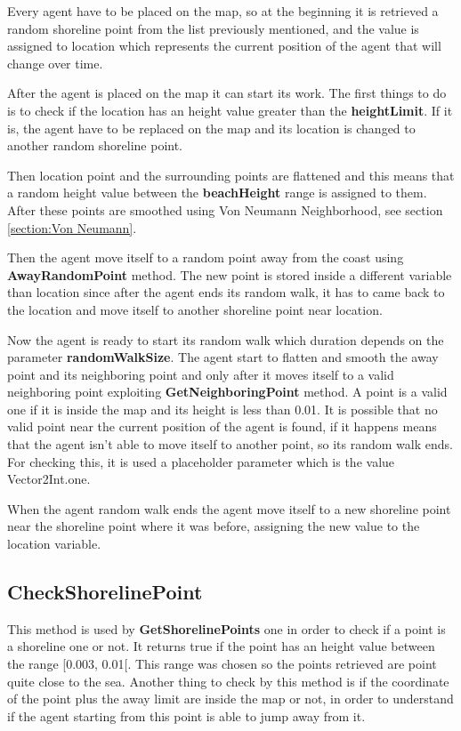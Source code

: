 \documentclass[12pt]{article}
\begin{document}
    Every agent have to be placed on the map, so at the beginning it is retrieved a random shoreline point from the list previously mentioned, and the value is assigned to location
    which represents the current position of the agent that will change over time.

    After the agent is placed on the map it can start its work. The first things to do is to check if the location has an height value greater than the \textbf{heightLimit}.
    If it is, the agent have to be replaced on the map and its location is changed to another random shoreline point.
    
    Then location point and the surrounding points are flattened and this means that a random height value between the \textbf{beachHeight} range is assigned
    to them. After these points are smoothed using Von Neumann Neighborhood, see section \ref{section:Von Neumann}.

    Then the agent move itself to a random point away from the coast using \textbf{AwayRandomPoint} method. The new point is stored inside a different variable
    than location since after the agent ends its random walk, it has to came back to the location and move itself to another shoreline point near location.

    Now the agent is ready to start its random walk which duration depends on the parameter \textbf{randomWalkSize}. The agent start to flatten and smooth the away point
    and its neighboring point and only after it moves itself to a valid neighboring point exploiting \textbf{GetNeighboringPoint} method. A point is a valid one if it is 
    inside the map and its height is less than 0.01. It is possible that no valid point near the current position of the agent is found, if it happens means that the 
    agent isn't able to move itself to another point, so its random walk ends. For checking this, it is used a placeholder parameter which is the value Vector2Int.one.

    When the agent random walk ends the agent move itself to a new shoreline point near the shoreline point where it was before, assigning the new value to the 
    location variable.

    \subsection{CheckShorelinePoint}
    This method is used by \textbf{GetShorelinePoints} one in order to check if a point is a shoreline one or not. It returns true if the point has an height value
    between the range [0.003, 0.01[. This range was chosen so the points retrieved are point quite close to the sea. Another thing to check by this method is
    if the coordinate of the point plus the away limit are inside the map or not, in order to understand if the agent starting from this point is able to jump away from it.
\end{document}
